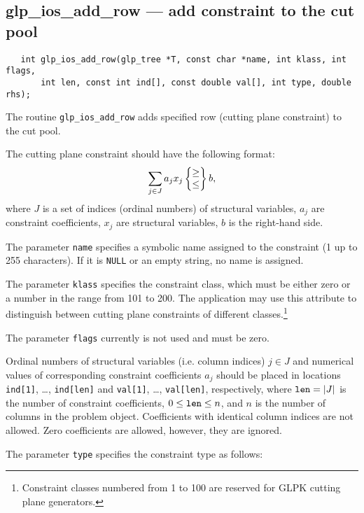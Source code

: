 \subsection{glp\_ios\_add\_row --- add constraint to the cut pool}

\synopsis

\begin{verbatim}
   int glp_ios_add_row(glp_tree *T, const char *name, int klass, int flags,
       int len, const int ind[], const double val[], int type, double rhs);
\end{verbatim}

\description

The routine \verb|glp_ios_add_row| adds specified row (cutting plane
constraint) to the cut pool.

The cutting plane constraint should have the following format:
$$\sum_{j\in J}a_jx_j\left\{\begin{array}{@{}c@{}}\geq\\\leq\\
\end{array}\right\}b,$$
where $J$ is a set of indices (ordinal numbers) of structural
variables, $a_j$ are constraint coefficients, $x_j$ are structural
variables, $b$ is the right-hand side.

The parameter \verb|name| specifies a symbolic name assigned to the
constraint (1 up to 255 characters). If it is \verb|NULL| or an empty
string, no name is assigned.

The parameter \verb|klass| specifies the constraint class, which must
be either zero or a number in the range from 101 to 200.
The application may use this attribute to distinguish between cutting
plane constraints of different classes.\footnote{Constraint classes
numbered from 1 to 100 are reserved for GLPK cutting plane generators.}

The parameter \verb|flags| currently is not used and must be zero.

Ordinal numbers of structural variables (i.e. column indices) $j\in J$
and numerical values of corresponding constraint coefficients $a_j$
should be placed in locations \verb|ind[1]|, \dots, \verb|ind[len]| and
\verb|val[1]|, \dots, \verb|val[len]|, respectively, where
${\tt len}=|J|$ is the number of constraint coefficients,
$0\leq{\tt len}\leq n$, and $n$ is the number of columns in the problem
object. Coefficients with identical column indices are not allowed.
Zero coefficients are allowed, however, they are ignored.

The parameter \verb|type| specifies the constraint type as follows:


